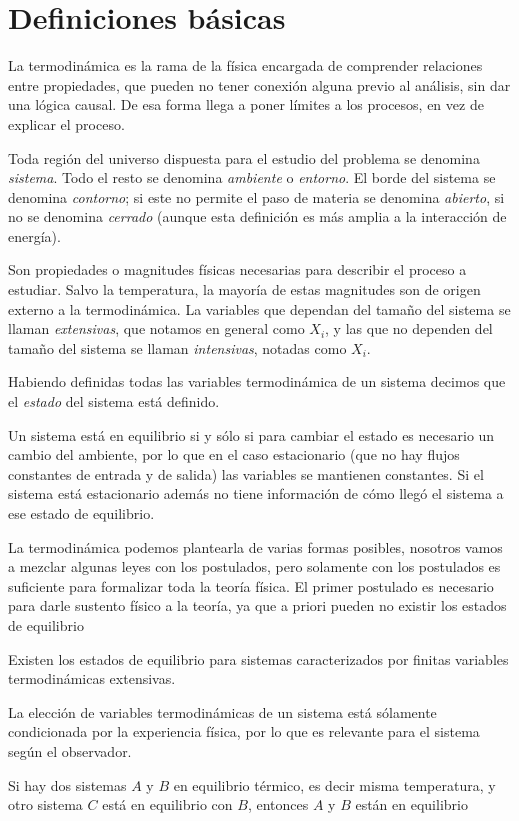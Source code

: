 \section{Definiciones básicas}
La termodinámica es la rama de la física encargada de comprender relaciones entre propiedades, que pueden no tener conexión alguna previo al análisis, sin dar una lógica causal.
De esa forma llega a poner límites a los procesos, en vez de explicar el proceso.
\begin{definition}[Sistema]
Toda región del universo dispuesta para el estudio del problema se denomina \emph{sistema}.
Todo el resto se denomina \emph{ambiente} o \emph{entorno}.
El borde del sistema se denomina \emph{contorno}; si este no permite el paso de materia se denomina \emph{abierto}, si no se denomina \emph{cerrado} (aunque esta definición es más amplia a la interacción de energía).
\end{definition}
\begin{definition}
Son propiedades o magnitudes físicas necesarias para describir el proceso a estudiar.
Salvo la temperatura, la mayoría de estas magnitudes son de origen externo a la termodinámica.
La variables que dependan del tamaño del sistema se llaman \emph{extensivas}, que notamos en general como $X_i$, y las que no dependen del tamaño del sistema se llaman \emph{intensivas}, notadas como $X_i$.
\end{definition}
\begin{definition}[Estado] Habiendo definidas todas las variables termodinámica de un sistema decimos que el \emph{estado} del sistema está definido. \end{definition}
\begin{definition}[Equilibrio]
Un sistema está en equilibrio si y sólo si para cambiar el estado es necesario un cambio del ambiente, por lo que en el caso estacionario (que no hay flujos constantes de entrada y de salida) las variables se mantienen constantes.
Si el sistema está estacionario además no tiene información de cómo llegó el sistema a ese estado de equilibrio.
\end{definition}
La termodinámica podemos plantearla de varias formas posibles, nosotros vamos a mezclar algunas leyes con los postulados, pero solamente con los postulados es suficiente para formalizar toda la teoría física.
El primer postulado es necesario para darle sustento físico a la teoría, ya que a priori pueden no existir los estados de equilibrio
\begin{principle}
Existen los estados de equilibrio para sistemas caracterizados por finitas variables termodinámicas extensivas.
\end{principle}
La elección de variables termodinámicas de un sistema está sólamente condicionada por la experiencia física, por lo que es relevante para el sistema según el observador.
\begin{law}
Si hay dos sistemas $A$ y $B$ en equilibrio térmico, es decir misma temperatura, y otro sistema $C$ está en equilibrio con $B$, entonces $A$ y $B$ están en equilibrio
\end{law}
